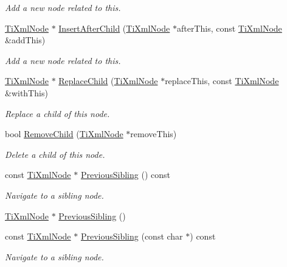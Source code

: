 \begin{DoxyCompactItemize}
\begin{DoxyCompactList}\small\item\em Add a new node related to this. \item\end{DoxyCompactList}\item 
\hyperlink{classTiXmlNode}{TiXmlNode} $\ast$ \hyperlink{classTiXmlNode_a274db3292218202805c093f66a964cb5}{InsertAfterChild} (\hyperlink{classTiXmlNode}{TiXmlNode} $\ast$afterThis, const \hyperlink{classTiXmlNode}{TiXmlNode} \&addThis)
\begin{DoxyCompactList}\small\item\em Add a new node related to this. \item\end{DoxyCompactList}\item 
\hyperlink{classTiXmlNode}{TiXmlNode} $\ast$ \hyperlink{classTiXmlNode_a543208c2c801c84a213529541e904b9f}{ReplaceChild} (\hyperlink{classTiXmlNode}{TiXmlNode} $\ast$replaceThis, const \hyperlink{classTiXmlNode}{TiXmlNode} \&withThis)
\begin{DoxyCompactList}\small\item\em Replace a child of this node. \item\end{DoxyCompactList}\item 
bool \hyperlink{classTiXmlNode_ae19d8510efc90596552f4feeac9a8fbf}{RemoveChild} (\hyperlink{classTiXmlNode}{TiXmlNode} $\ast$removeThis)
\begin{DoxyCompactList}\small\item\em Delete a child of this node. \item\end{DoxyCompactList}\item 
const \hyperlink{classTiXmlNode}{TiXmlNode} $\ast$ \hyperlink{classTiXmlNode_ac2cd892768726270e511b2ab32de4d10}{PreviousSibling} () const 
\begin{DoxyCompactList}\small\item\em Navigate to a sibling node. \item\end{DoxyCompactList}\item 
\hyperlink{classTiXmlNode}{TiXmlNode} $\ast$ \hyperlink{classTiXmlNode_af8c0642ad6ecc03f62953e68896ed1cc}{PreviousSibling} ()
\item 
const \hyperlink{classTiXmlNode}{TiXmlNode} $\ast$ \hyperlink{classTiXmlNode_abbb3b8c1f38fa7b9e52d584a4aeca795}{PreviousSibling} (const char $\ast$) const 
\begin{DoxyCompactList}\small\item\em Navigate to a sibling node. \item\end{DoxyCompactList}\item 

\end{DoxyCompactItemize}
